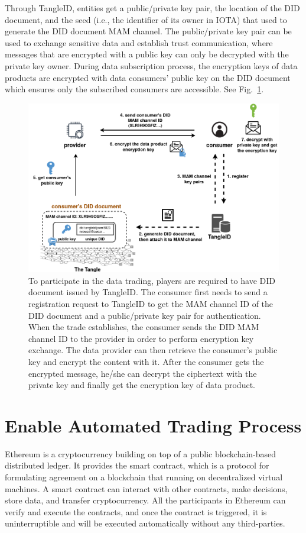\begin{spacing}{2.0}
Through TangleID, entities get a public/private key pair, the location of the DID document, and the seed (i.e., the identifier of its owner in IOTA) that used to generate the DID document MAM channel. The public/private key pair can be used to exchange sensitive data and establish trust communication, where messages that are encrypted with a public key can only be decrypted with the private key owner. During data subscription process, the encryption keys of data products are encrypted with data consumers' public key on the DID document which ensures only the subscribed consumers are accessible. See Fig.~\ref{fig:TangleID}.

\begin{figure}[h]
    \centering
    \includegraphics[width=5.5in]{img/TangleID}
    \caption{To participate in the data trading, players are required to have DID document issued by TangleID. The consumer first needs to send a registration request to TangleID to get the MAM channel ID of the DID document and a public/private key pair for authentication. When the trade establishes, the consumer sends the DID MAM channel ID to the provider in order to perform encryption key exchange. The data provider can then retrieve the consumer's public key and encrypt the content with it. After the consumer gets the encrypted message, he/she can decrypt the ciphertext with the private key and finally get the encryption key of data product.}
    \label{fig:TangleID}
\end{figure}
\clearpage

\section{Enable Automated Trading Process}
Ethereum is a cryptocurrency building on top of a public blockchain-based distributed ledger. It provides the smart contract, which is a protocol for formulating agreement on a blockchain that running on decentralized virtual machines. A smart contract can interact with other contracts, make decisions, store data, and transfer cryptocurrency. All the participants in Ethereum can verify and execute the contracts, and once the contract is triggered, it is uninterruptible and will be executed automatically without any third-parties.


\end{spacing}
